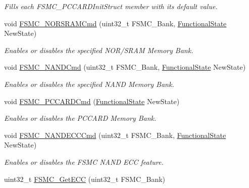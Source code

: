 \begin{DoxyCompactItemize}
\begin{DoxyCompactList}\small\item\em Fills each F\+S\+M\+C\+\_\+\+P\+C\+C\+A\+R\+D\+Init\+Struct member with its default value. \end{DoxyCompactList}\item 
void \mbox{\hyperlink{group___f_s_m_c___private___functions_gaf943f0f2680168d3a95a3c2c9f3eca2a}{F\+S\+M\+C\+\_\+\+N\+O\+R\+S\+R\+A\+M\+Cmd}} (uint32\+\_\+t F\+S\+M\+C\+\_\+\+Bank, \mbox{\hyperlink{group___exported__types_gac9a7e9a35d2513ec15c3b537aaa4fba1}{Functional\+State}} New\+State)
\begin{DoxyCompactList}\small\item\em Enables or disables the specified N\+O\+R/\+S\+R\+AM Memory Bank. \end{DoxyCompactList}\item 
void \mbox{\hyperlink{group___f_s_m_c___private___functions_ga33ec7c39ea4d42e92c72c6e517d8235c}{F\+S\+M\+C\+\_\+\+N\+A\+N\+D\+Cmd}} (uint32\+\_\+t F\+S\+M\+C\+\_\+\+Bank, \mbox{\hyperlink{group___exported__types_gac9a7e9a35d2513ec15c3b537aaa4fba1}{Functional\+State}} New\+State)
\begin{DoxyCompactList}\small\item\em Enables or disables the specified N\+A\+ND Memory Bank. \end{DoxyCompactList}\item 
void \mbox{\hyperlink{group___f_s_m_c___private___functions_ga2d410151ceb3428c6a1bf374a0472cde}{F\+S\+M\+C\+\_\+\+P\+C\+C\+A\+R\+D\+Cmd}} (\mbox{\hyperlink{group___exported__types_gac9a7e9a35d2513ec15c3b537aaa4fba1}{Functional\+State}} New\+State)
\begin{DoxyCompactList}\small\item\em Enables or disables the P\+C\+C\+A\+RD Memory Bank. \end{DoxyCompactList}\item 
void \mbox{\hyperlink{group___f_s_m_c___private___functions_ga5800301fc39bbe998a18ebd9ff191cdc}{F\+S\+M\+C\+\_\+\+N\+A\+N\+D\+E\+C\+C\+Cmd}} (uint32\+\_\+t F\+S\+M\+C\+\_\+\+Bank, \mbox{\hyperlink{group___exported__types_gac9a7e9a35d2513ec15c3b537aaa4fba1}{Functional\+State}} New\+State)
\begin{DoxyCompactList}\small\item\em Enables or disables the F\+S\+MC N\+A\+ND E\+CC feature. \end{DoxyCompactList}\item 
uint32\+\_\+t \mbox{\hyperlink{group___f_s_m_c___private___functions_gaad6d4f5b5a41684ce053fea55bdb98d8}{F\+S\+M\+C\+\_\+\+Get\+E\+CC}} (uint32\+\_\+t F\+S\+M\+C\+\_\+\+Bank)

\end{DoxyCompactItemize}
